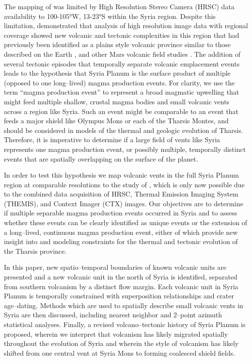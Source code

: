 The mapping of \citet{Baptista2008} was limited by High Resolution Stereo Camera (HRSC) data availability to 100-105°W, 13-23°S within the Syria region. Despite this limitation, \citet{Baptista2008} demonstrated that analysis of high resolution image data with regional coverage showed new volcanic and tectonic complexities in this region that had previously been identified as a plains style volcanic province \citep{Sakimoto2003} similar to those described on the Earth \citep{Greeley1982}, and other Mars volcanic field studies \citep{Bleacher2007,Bleacher2009,Hauber2009}. The addition of several tectonic episodes that temporally separate volcanic emplacement events leads to the hypothesis that Syria Planum is the surface product of multiple (opposed to one long--lived) magma production events. For clarity, we use the term ``magma production event'' to represent a broad magmatic upwelling that might feed multiple shallow, crustal magma bodies and small volcanic vents across a region like Syria. Such an event might be comparable to an event that feeds a major shield like Olympus Mons or each of the Tharsis Montes, and should be considered in models of the thermal and geologic evolution of Tharsis. Therefore, it is imperative to determine if a large field of vents like Syria represents one magma production event, or possibly multiple, temporally distinct events that are spatially overlapping on the surface of the planet.

In order to test this hypothesis we map volcanic vents in the full Syria Planum region at comparable resolutions to the study of \citet{Baptista2008}, which is only now possible due to the combined data acquisition of HRSC, Thermal Emission Imaging System (THEMIS), and Context Imager (CTX) images. Our objectives are to determine if multiple separable magma production events occurred in Syria and to assess whether these events can be clearly identified as unique events or the extension of a long--lived, continuous magma production event, either of which provide new insight into and modeling constraints for the thermal and tectonic evolution of the Tharsis province.

In this paper, new spatio--temporal boundaries of known volcanic units are presented and a new volcanic unit in the north of Syria is identified, separated from southern volcanism by a distinct flow margin. Each volcanic unit in Syria Planum is temporally constrained with superposition relationships and crater age--dating. Methods which are used to spatially describe small volcanic vents in Syria are then discussed, including nearest neighbor and 2--point azimuth statistical analyses. Finally, a revised volcano--tectonic history of Syria Planum is proposed, wherein we interpret that volcanism has likely migrated spatially throughout the evolution of Syria and wherein the style of volcanism has likely shifted from one central vent at Syria Mons to forming coalesced shield fields.

